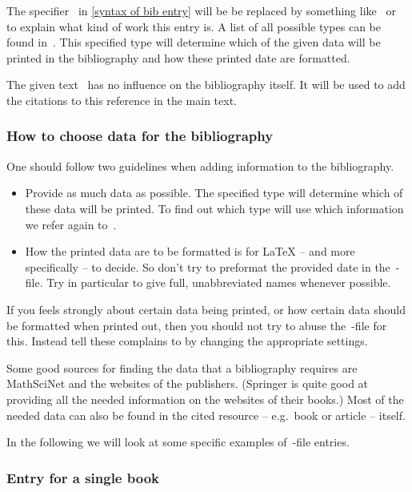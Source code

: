 The specifier~ in \cref{syntax of bib entry} will be be replaced by something like~ or~ to explain what kind of work this entry is.
A list of all possible types can be found in~\cite[2.1]{biblatex}.
This specified type will determine which of the given data will be printed in the bibliography and how these printed date are formatted.

The given text~ has no influence on the bibliography itself.
It will be used to add the citations to this reference in the main text.

\subsubsection{How to choose data for the bibliography}

One should follow two guidelines when adding information to the bibliography.
\begin{itemize}
  \item
    Provide as much data as possible.
    The specified type will determine which of these data will be printed.
    To find out which type will use which information we refer again to~\cite[2.1, 2.2]{biblatex}.
  \item
    How the printed data are to be formatted is for {\LaTeX} -- and more specifically  -- to decide.
    So don’t try to preformat the provided date in the~-file.
    Try in particular to give full, unabbreviated names whenever possible.
\end{itemize}
If you feels strongly about certain data being printed, or how certain data should be formatted when printed out, then you should not try to abuse the~-file for this.
Instead tell these complains to  by changing the appropriate settings.

Some good sources for finding the data that a bibliography requires are MathSciNet and the websites of the publishers.
(Springer is quite good at providing all the needed information on the websites of their books.)
Most of the needed data can also be found in the cited resource -- e.g.\ book or article -- itself.

In the following we will look at some specific examples of~-file entries.

\subsubsection{Entry for a single book}

